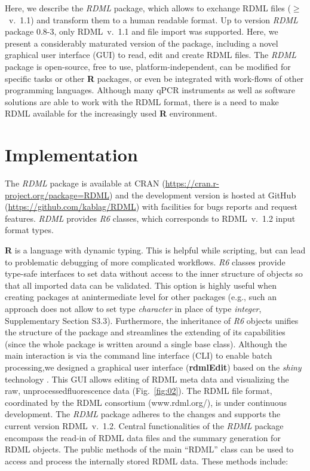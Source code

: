 \documentclass{bioinfo}
\begin{document}
Here, we describe the \textit{RDML} package, which 
allows to exchange RDML files ($\geq$~v.~1.1) and transform them to  a human 
readable format.  Up to version \textit{RDML} package 0.8-3, only RDML~v.~1.1 and 
file import was supported. Here, we present a considerably maturated version of 
the package, including a novel graphical user interface (GUI) to read, edit and create RDML files. The \textit{RDML} package is open-source, free to use, 
platform-independent, can be modified for specific tasks or other 
\textbf{R} packages, or even be integrated  with work-flows  of other programming 
languages.  Although many qPCR instruments as well as software solutions are able 
to work with the RDML format, there is a need to make RDML available for the increasingly 
used \textbf{R} environment.

\section{Implementation}
The \textit{RDML} package is available at CRAN 
(\url{https://cran.r-project.org/package=RDML}) and the 
development version is hosted at GitHub (\url{https://github.com/kablag/RDML}) 
with facilities for bugs reports and request features. \textit{RDML} provides 
\emph{R6} classes, which corresponds to RDML~v.~1.2 input format types. 



\textbf{R} 
is a language with dynamic typing. This is helpful while scripting, but can lead 
to problematic debugging of more complicated workflows. \emph{R6} classes 
provide type-safe interfaces to set data without access to the inner structure of 
objects so that all imported data can be validated. This option is  highly useful when 
creating packages  at anintermediate level for other packages (e.g., such an
approach does not allow to set type \emph{character} in place of type \emph{integer}, 
Supplementary Section S3.3). Furthermore, the inheritance of \emph{R6} objects 
unifies the structure of the package and streamlines the extending of its capabilities 
(since the whole package is written around a single base class). Although the main interaction 
is via the command line interface (CLI) to enable batch processing,we designed  a graphical user
interface (\textbf{rdmlEdit}) based on the \textit{shiny} technology  \cite{roediger2015chippcr}. This GUI allows editing  of RDML meta data and  visualizing the raw, unprocessedfluorescence data
(Fig.~\ref{fig:02}). The RDML file format, coordinated by the RDML consortium (www.rdml.org/), is under continuous development. The \textit{RDML} 
package  adheres to the changes and supports the current version RDML~v.~1.2. 
Central functionalities of the \textit{RDML} package encompass the read-in of RDML 
data files and the summary generation for RDML objects. The public methods of the main  “RDML” class can be used 
to access and process the internally stored RDML data. These methods include:
\end{document}
